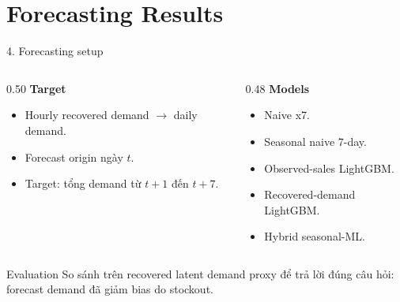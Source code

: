 \documentclass[aspectratio=169,10pt]{beamer}
\begin{document}
\section{Forecasting Results}
\begin{frame}{4. Forecasting setup}
    \begin{columns}[T]
        \begin{column}{0.50\linewidth}
            \textbf{Target}
            \begin{itemize}
                \item Hourly recovered demand $\rightarrow$ daily demand.
                \item Forecast origin ngày $t$.
                \item Target: tổng demand từ $t+1$ đến $t+7$.
            \end{itemize}
        \end{column}
        \begin{column}{0.48\linewidth}
            \textbf{Models}
            \begin{itemize}
                \item Naive x7.
                \item Seasonal naive 7-day.
                \item Observed-sales LightGBM.
                \item Recovered-demand LightGBM.
                \item Hybrid seasonal-ML.
            \end{itemize}
        \end{column}
    \end{columns}
    \vspace{0.2cm}
    \begin{block}{Evaluation}
    So sánh trên recovered latent demand proxy để trả lời đúng câu hỏi: forecast demand đã giảm bias do stockout.
    \end{block}
\end{frame}
\end{document}
